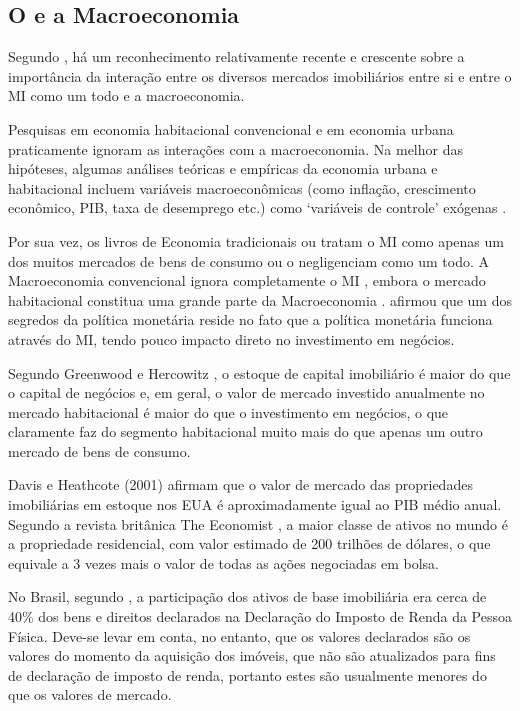 \documentclass[
	12pt,				%
	oneside,			%
	a4paper,			%
	chapter=TITLE,		%
	section=TITLE,		%
	english,			%
	brazil				%
	]{abntex2}
\begin{document}
\begin{refsection}
\hypertarget{macro}{%
\section{\texorpdfstring{O  e a Macroeconomia}{O  e a Macroeconomia}}\label{macro}}

Segundo \textcite{LEUNG}, há um reconhecimento relativamente recente e crescente
sobre a importância da interação entre os diversos mercados imobiliários entre
si e entre o \gls{MI} como um todo e a macroeconomia.

Pesquisas em economia habitacional convencional e em economia urbana
praticamente ignoram as interações com a macroeconomia. Na melhor das hipóteses,
algumas análises teóricas e empíricas da economia urbana e habitacional incluem
variáveis macroeconômicas (como inflação, crescimento econômico, PIB, taxa de
desemprego etc.) como `variáveis de controle' exógenas \autocite[3]{LEUNG}.

Por sua vez, os livros de Economia tradicionais ou tratam o \gls{MI} como
apenas um dos muitos mercados de bens de consumo ou o negligenciam como um todo.
A Macroeconomia convencional ignora completamente o \gls{MI} \autocite[3]{LEUNG},
embora o mercado habitacional constitua uma grande parte da Macroeconomia
\autocite[5]{LEUNG}. \textcite{krugman} afirmou que um dos segredos da política monetária reside
no fato que a política monetária funciona através do \gls{MI}, tendo
pouco impacto direto no investimento em negócios.

Segundo Greenwood e Hercowitz \autocite[\emph{apud}][5]{LEUNG}, o estoque de capital
imobiliário é maior do que o capital de negócios e, em geral, o valor de mercado
investido anualmente no mercado habitacional é maior do que o investimento em
negócios, o que claramente faz do segmento habitacional muito mais do que apenas
um outro mercado de bens de consumo.

Davis e Heathcote (2001) \autocite[\emph{apud}][6]{LEUNG} afirmam que o valor de mercado das
propriedades imobiliárias em estoque nos \gls{EUA} é aproximadamente igual ao PIB
médio anual. Segundo a revista britânica The Economist \autocite{economist}, a maior
classe de ativos no mundo é a propriedade residencial, com valor estimado de 200
trilhões de dólares, o que equivale a 3 vezes mais o valor de todas as ações
negociadas em bolsa.

No Brasil, segundo \textcites[155]{fnogueira,fnogueira}, a participação dos ativos de
base imobiliária era cerca de 40\% dos bens e direitos declarados na Declaração
do Imposto de Renda da Pessoa Física. Deve-se levar em conta, no entanto, que
os valores declarados são os valores do momento da aquisição dos imóveis, que
não são atualizados para fins de declaração de imposto de renda, portanto estes
são usualmente menores do que os valores de mercado.


\end{refsection}
\end{document}
